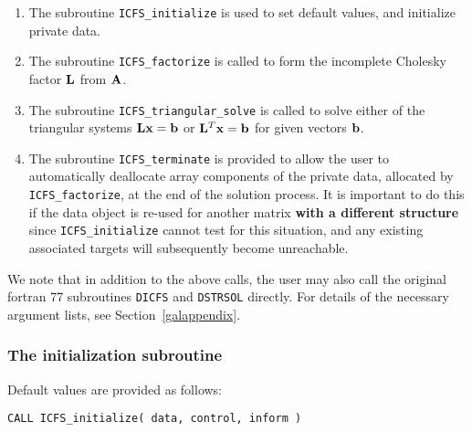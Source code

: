 \documentclass{galahad}
\newcommand{\packagename}{ICFS}
\begin{document}
\begin{enumerate}
\item The subroutine
      {\tt \packagename\_initialize}
      is used to set default values, and initialize private data.
\item The subroutine
      {\tt \packagename\_factorize}
      is called to form the incomplete Cholesky factor ${\mathbf{L}}$ from ${\mathbf{A}}$.
\item The subroutine
      {\tt \packagename\_triangular\_solve}
      is called to solve either of the triangular systems
      ${\mathbf{L}} {\mathbf{x}} = {\mathbf{b}}$ or ${\mathbf{L}}^T {\mathbf{x}} = {\mathbf{b}}$
      for given vectors ${\mathbf{b}}$.
\item The subroutine
      {\tt \packagename\_terminate}
      is provided to allow the user to automatically deallocate array
       components of the private data, allocated by
       {\tt \packagename\_factorize},
       at the end of the solution process.
       It is important to do this if the data object is re-used for another
       matrix {\bf with a different structure}
       since {\tt \packagename\_initialize} cannot test for this situation,
       and any existing associated targets will subsequently become unreachable.
\end{enumerate}

\noindent
We note that in addition to the above calls, the user may also call the
original fortran 77 subroutines {\tt DICFS} and {\tt DSTRSOL} directly.
For details of the necessary argument lists, see Section~\ref{galappendix}.



\subsubsection{The initialization subroutine}\label{subinit}
 Default values are provided as follows:
\vspace*{1mm}

\hspace{8mm}
{\tt CALL \packagename\_initialize( data, control, inform )}
\end{document}
